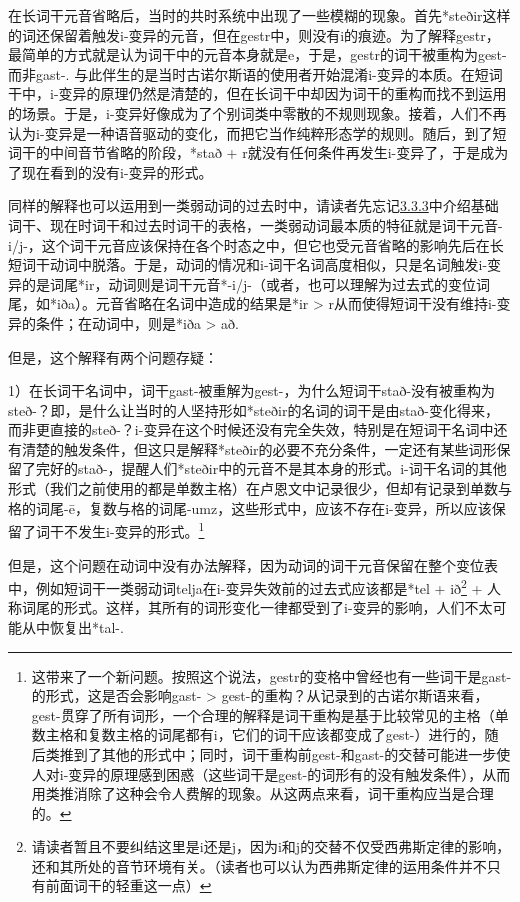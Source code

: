 在长词干元音省略后，当时的共时系统中出现了一些模糊的现象。首先*steðir这样的词还保留着触发i-变异的元音，但在gestr中，则没有i的痕迹。为了解释gestr，最简单的方式就是认为词干中的元音本身就是e，于是，gestr的词干被重构为gest-而非gast-.
与此伴生的是当时古诺尔斯语的使用者开始混淆i-变异的本质。在短词干中，i-变异的原理仍然是清楚的，但在长词干中却因为词干的重构而找不到运用的场景。于是，i-变异好像成为了个别词类中零散的不规则现象。接着，人们不再认为i-变异是一种语音驱动的变化，而把它当作纯粹形态学的规则。随后，到了短词干的中间音节省略的阶段，*stað
+ r就没有任何条件再发生i-变异了，于是成为了现在看到的没有i-变异的形式。

同样的解释也可以运用到一类弱动词的过去时中，请读者先忘记\hyperref[ux7b2cux4e00ux5f31ux53d8ux4f4dux6cd5]{3.3.3}中介绍基础词干、现在时词干和过去时词干的表格，一类弱动词最本质的特征就是词干元音-i/j-，这个词干元音应该保持在各个时态之中，但它也受元音省略的影响先后在长短词干动词中脱落。于是，动词的情况和i-词干名词高度相似，只是名词触发i-变异的是词尾*ir，动词则是词干元音*-i/j-（或者，也可以理解为过去式的变位词尾，如*iða）。元音省略在名词中造成的结果是*ir
\textgreater{} r从而使得短词干没有维持i-变异的条件；在动词中，则是*iða
\textgreater{} að.

但是，这个解释有两个问题存疑：

1）在长词干名词中，词干gast-被重解为gest-，为什么短词干stað-没有被重构为steð-？即，是什么让当时的人坚持形如*steðir的名词的词干是由stað-变化得来，而非更直接的steð-？i-变异在这个时候还没有完全失效，特别是在短词干名词中还有清楚的触发条件，但这只是解释*steðir的必要不充分条件，一定还有某些词形保留了完好的stað-，提醒人们*steðir中的元音不是其本身的形式。i-词干名词的其他形式（我们之前使用的都是单数主格）在卢恩文中记录很少，但却有记录到单数与格的词尾-ē，复数与格的词尾-umz，这些形式中，应该不存在i-变异，所以应该保留了词干不发生i-变异的形式。\footnote{这带来了一个新问题。按照这个说法，gestr的变格中曾经也有一些词干是gast-的形式，这是否会影响gast-
  \textgreater{}
  gest-的重构？从记录到的古诺尔斯语来看，gest-贯穿了所有词形，一个合理的解释是词干重构是基于比较常见的主格（单数主格和复数主格的词尾都有i，它们的词干应该都变成了gest-）进行的，随后类推到了其他的形式中；同时，词干重构前gest-和gast-的交替可能进一步使人对i-变异的原理感到困惑（这些词干是gest-的词形有的没有触发条件），从而用类推消除了这种会令人费解的现象。从这两点来看，词干重构应当是合理的。}

但是，这个问题在动词中没有办法解释，因为动词的词干元音保留在整个变位表中，例如短词干一类弱动词telja在i-变异失效前的过去式应该都是*tel
+ ið\footnote{请读者暂且不要纠结这里是i还是j，因为i和j的交替不仅受西弗斯定律的影响，还和其所处的音节环境有关。（读者也可以认为西弗斯定律的运用条件并不只有前面词干的轻重这一点）}
+
人称词尾的形式。这样，其所有的词形变化一律都受到了i-变异的影响，人们不太可能从中恢复出*tal-.

